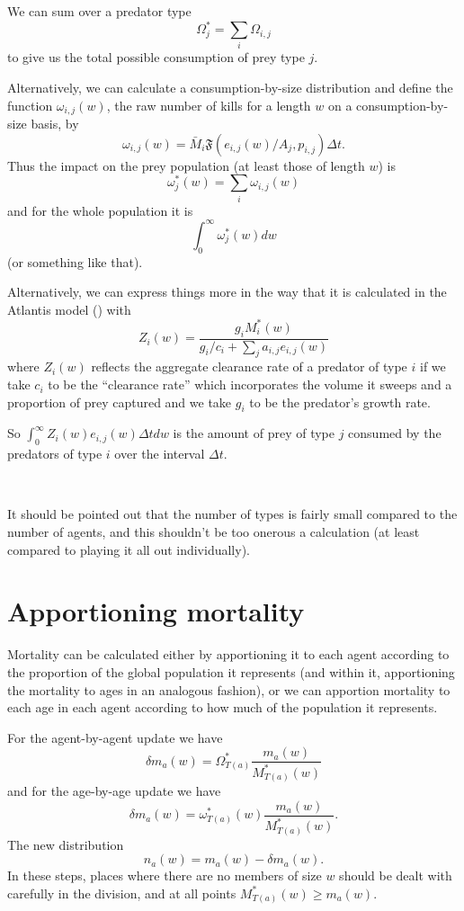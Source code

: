 We can sum over a predator type
\[ \Omega_j^{\ast} = \sum_i \Omega_{i,j} \]
to give us the total possible consumption of prey type $j$. \

Alternatively, we can calculate a consumption-by-size distribution and define
the function $\omega_{i,j} (w)$, the raw number of kills for a length $w$ on a
consumption-by-size basis, by
\[ \omega_{i,j} (w) = \bar{M}_i \mathfrak{F} (e_{i,j} (w) / A_j, p_{i,j})
   \Delta t. \]
Thus the impact on the prey population (at least those of length $w$) is
\[ \omega_j^{\ast} (w) = \sum_i \omega_{i,j} (w) \]
and for the whole population it is
\[ \int_0^{\infty} \omega^{\ast}_j (w) d w \]
(or something like that).

Alternatively, we can express things more in the way that it is
calculated in the Atlantis model (\cite{Fulton2011pcomm}) with
\[ Z_i (w) = \frac{g_i M^{\ast}_i (w)}{g_i / c_i + \sum_j a_{i,j} e_{i,j} (w)}
\]
where $Z_i (w)$ reflects the aggregate clearance rate of a predator of type
$i$ if we take $c_i$ to be the ``clearance rate'' which incorporates the
volume it sweeps and a proportion of prey captured and we take $g_i$ to be the
predator's growth rate.

So $\int_0^{\infty} Z_i (w) e_{i,j} (w) \Delta t d w$ is the amount of prey of
type $j$ consumed by the predators of type $i$ over the interval $\Delta t$.

\

It should be pointed out that the number of types is fairly small compared to
the number of agents, and this shouldn't be too onerous a calculation (at
least compared to playing it all out individually).

\section{Apportioning mortality}

Mortality can be calculated either by apportioning it to each agent according
to the proportion of the global population it represents (and within it,
apportioning the mortality to ages in an analogous fashion), or we can
apportion mortality to each age in each agent according to how much of the
population it represents.

For the agent-by-agent update we have
\[ \delta m_a (w) = \Omega^{\ast}_{T (a)}  \frac{m_a (w)}{M^{\ast}_{T (a)}
   (w)} \]
and for the age-by-age update we have
\[ \delta m_a (w) = \omega^{\ast}_{T (a)} (w)  \frac{m_a (w)}{M^{\ast}_{T (a)}
   (w)} . \]
The new distribution
\[ n_a (w) = m_a (w) - \delta m_a (w) . \]
In these steps, places where there are no members of size $w$ should be dealt
with carefully in the division, and at all points $M^{\ast}_{T (a)} (w)
\geqslant m_a (w)$.


